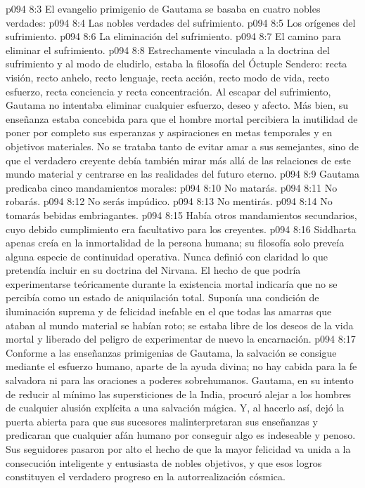 \vs p094 8:3 \pc El evangelio primigenio de Gautama se basaba en cuatro nobles verdades:
\vs p094 8:4 Las nobles verdades del sufrimiento.
\vs p094 8:5 Los orígenes del sufrimiento.
\vs p094 8:6 La eliminación del sufrimiento.
\vs p094 8:7 El camino para eliminar el sufrimiento.
\vs p094 8:8 \pc Estrechamente vinculada a la doctrina del sufrimiento y al modo de eludirlo, estaba la filosofía del Óctuple Sendero: recta visión, recto anhelo, recto lenguaje, recta acción, recto modo de vida, recto esfuerzo, recta conciencia y recta concentración. Al escapar del sufrimiento, Gautama no intentaba eliminar cualquier esfuerzo, deseo y afecto. Más bien, su enseñanza estaba concebida para que el hombre mortal percibiera la inutilidad de poner por completo sus esperanzas y aspiraciones en metas temporales y en objetivos materiales. No se trataba tanto de evitar amar a sus semejantes, sino de que el verdadero creyente debía también mirar más allá de las relaciones de este mundo material y centrarse en las realidades del futuro eterno.
\vs p094 8:9 \pc Gautama predicaba cinco mandamientos morales:
\vs p094 8:10 No matarás.
\vs p094 8:11 No robarás.
\vs p094 8:12 No serás impúdico.
\vs p094 8:13 No mentirás.
\vs p094 8:14 No tomarás bebidas embriagantes.
\vs p094 8:15 \pc Había otros mandamientos secundarios, cuyo debido cumplimiento era facultativo para los creyentes.
\vs p094 8:16 \pc Siddharta apenas creía en la inmortalidad de la persona humana; su filosofía solo preveía alguna especie de continuidad operativa. Nunca definió con claridad lo que pretendía incluir en su doctrina del Nirvana. El hecho de que podría experimentarse teóricamente durante la existencia mortal indicaría que no se percibía como un estado de aniquilación total. Suponía una condición de iluminación suprema y de felicidad inefable en el que todas las amarras que ataban al mundo material se habían roto; se estaba libre de los deseos de la vida mortal y liberado del peligro de experimentar de nuevo la encarnación.
\vs p094 8:17 Conforme a las enseñanzas primigenias de Gautama, la salvación se consigue mediante el esfuerzo humano, aparte de la ayuda divina; no hay cabida para la fe salvadora ni para las oraciones a poderes sobrehumanos. Gautama, en su intento de reducir al mínimo las supersticiones de la India, procuró alejar a los hombres de cualquier alusión explícita a una salvación mágica. Y, al hacerlo así, dejó la puerta abierta para que sus sucesores malinterpretaran sus enseñanzas y predicaran que cualquier afán humano por conseguir algo es indeseable y penoso. Sus seguidores pasaron por alto el hecho de que la mayor felicidad va unida a la consecución inteligente y entusiasta de nobles objetivos, y que esos logros constituyen el verdadero progreso en la autorrealización cósmica.
